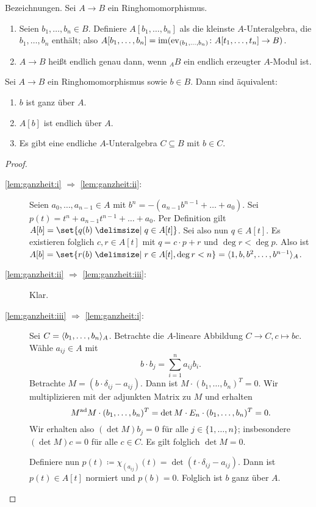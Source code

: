 \documentclass[12pt,a4paper]{scrartcl}
\theoremstyle{cplain}
\theoremstyle{cdef}
\begin{document}
\medskip

Bezeichnungen. Sei $A\to B$ ein Ringhomomorphismus.
\begin{enumerate}
	\item Seien $b_1,\dots,b_n\in B$. Definiere $A[b_1,\dots, b_n]$ als die kleinste $A$-Unteralgebra, die $b_1,\dots, b_n$ enthält; also $A[b_1,\dots, b_n] = \operatorname{im} (\operatorname{ev}_{(b_1,\dots, b_n)}\colon A[t_1,\dots, t_n]\to B)$.
	\item $A\to B$ heißt endlich genau dann, wenn ${}_AB$ ein endlich erzeugter $A$-Modul ist.
\end{enumerate}

\begin{lem} \label{lem:ganzheit}
	Sei $A\to B$ ein Ringhomomorphismus sowie $b\in B$. Dann sind äquivalent:
	\begin{enumerate}
		\item $b$ ist ganz über $A$. \label{lem:ganzheit:i}
		\item $A[b]$ ist endlich über $A$. \label{lem:ganzheit:ii}
		\item Es gibt eine endliche $A$-Unteralgebra $C\subseteq B$ mit $b\in C$. \label{lem:ganzheit:iii}
	\end{enumerate}
\end{lem}


\begin{proof}
	\leavevmode
	\begin{description}
		\item[\ref{lem:ganzheit:i} $\Rightarrow$ \ref{lem:ganzheit:ii}:] Seien $a_0,\dots, a_{n-1}\in A$ mit $b^n = -(a_{n-1}b^{n-1}+\dots+a_0)$. Sei $p(t) = t^n+a_{n-1}t^{n-1}+\dots + a_0$. Per Definition gilt $A[b] = \set{q(b)\given q\in A[t]}$. Sei also nun $q\in A[t]$. Es existieren folglich $c,r\in A[t]$ mit $q = c\cdot p +r $ und $\deg r < \deg p$. Also ist $A[b] = \set{r(b)\given r\in A[t], \deg r <n} = \<1, b, b^2,\dots, b^{n-1}\>_A$.
		
		\item[\ref{lem:ganzheit:ii} $\Rightarrow$ \ref{lem:ganzheit:iii}:] Klar.
		\item[\ref{lem:ganzheit:iii} $\Rightarrow$ \ref{lem:ganzheit:i}:] Sei $C = \langle b_1, \dots, b_n\rangle_A$. Betrachte die $A$-lineare Abbildung $C\to C, c\mapsto bc$. Wähle $a_{ij}\in A$ mit 
		\[b\cdot b_j = \sum_{i=1}^{n}a_{ij}b_i.\]
		Betrachte $M = (b\cdot \delta_{ij}-a_{ij})$. Dann ist $M\cdot (b_1,\dots, b_n)^T = 0$. Wir multiplizieren mit der adjunkten Matrix zu $M$ und erhalten
		\[M^{\operatorname{ad}} M \cdot (b_1,\ldots,b_n)^T = \det M \cdot E_n \cdot (b_1,\dots, b_n)^T = 0.\]
		Wir erhalten also $(\det M)b_j = 0$ für alle $j\in\{1,\dots, n\}$; insbesondere $(\det M)c = 0$ für alle $c\in C$. Es gilt folglich $\det M  = 0$.
		
		Definiere nun $p(t) \coloneqq \chi_{(a_{ij})}(t) = \det (t\cdot \delta_{ij}-a_{ij})$. Dann ist $p(t)\in A[t]$ normiert und $p(b) = 0$. Folglich ist $b$ ganz über $A$.
		\qedhere
	\end{description}
\end{proof}
\end{document}
